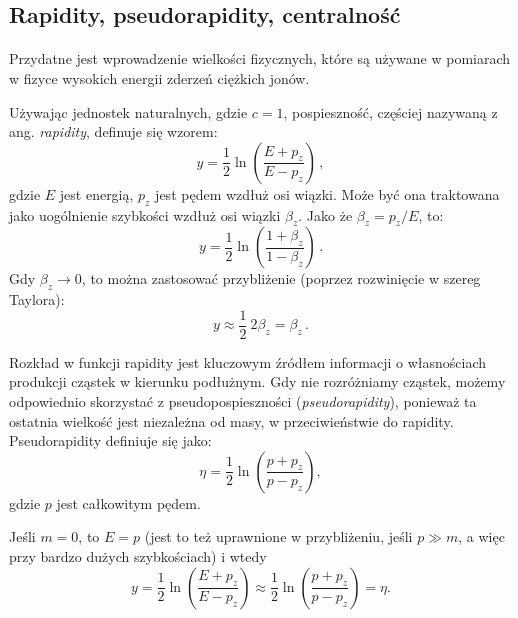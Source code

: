 \documentclass[a4paper,12pt]{article}
\begin{document}
\subsection{Rapidity, pseudorapidity, centralność}
\paragraph{}
Przydatne jest wprowadzenie wielkości fizycznych, które są używane w pomiarach w fizyce wysokich energii zderzeń ciężkich jonów.

Używając jednostek naturalnych, gdzie $c = 1$, pospieszność, częściej nazywaną z ang. \textit{rapidity}, definuje się wzorem: 
\begin{equation} \label{eq:rapid} 
y = \frac{1}{2} \ln \left( \frac{E + p_z}{E - p_z} \right)\,,
\end{equation}
gdzie $E$ jest energią, $p_z$ jest pędem wzdłuż osi wiązki. Może być ona traktowana jako uogólnienie szybkości wzdłuż osi wiązki $\beta_z$. Jako że $\beta_z = p_z / E$, to:
\begin{equation} \label{eq:rapid2}
y = \frac{1}{2} \ln \left( \frac{1 + \beta_z}{1 - \beta_z} \right)\,. 
\end{equation}
Gdy $\beta_z \to 0$, to można zastosować przybliżenie (poprzez rozwinięcie w szereg Taylora):
\begin{equation} \label{eq:rapid3}
y \approx \frac{1}{2} \ 2\beta_z = \beta_z \,.
\end{equation}

Rozkład w funkcji rapidity jest kluczowym źródłem informacji o własnościach produkcji cząstek w kierunku podłużnym. Gdy nie rozróżniamy cząstek, możemy odpowiednio skorzystać z pseudopospieszności (\textit{pseudorapidity}), ponieważ ta ostatnia wielkość jest niezależna od masy, w przeciwieństwie do rapidity. Pseudorapidity definiuje się jako:
\begin{equation} \label{eq:pseudorap}
\eta = \frac{1}{2} \ln \left( \frac{p + p_z}{p - p_z} \right),
\end{equation}
gdzie $p$ jest całkowitym pędem.

Jeśli $m = 0$, to $E = p$ (jest to też uprawnione w przybliżeniu, jeśli $p \gg m$, a więc przy bardzo dużych szybkościach) i wtedy
\begin{equation} \label{eq:rap-pseudorap}
 y = \frac{1}{2} \ln \left( \frac{E + p_z}{E - p_z} \right) \approx \frac{1}{2} \ln \left( \frac{p + p_z}{p - p_z} \right) = \eta. 
 \end{equation}
 
\end{document}
